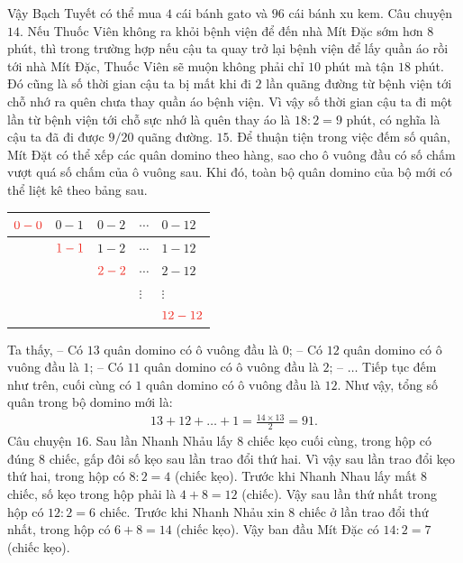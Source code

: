 Vậy Bạch Tuyết có thể mua $4$ cái bánh gato và $96$ cái bánh xu kem.
\vskip 0.1cm
Câu chuyện $14.$
\vskip 0.1cm
Nếu Thuốc Viên không ra khỏi bệnh viện để đến nhà Mít Đặc sớm hơn $8$ phút, thì trong trường hợp nếu cậu ta quay trở lại bệnh viện để lấy quần áo rồi tới nhà Mít Đặc, Thuốc Viên sẽ muộn không phải chỉ $10$ phút mà tận $18$ phút. Đó cũng là số thời gian cậu ta bị mất khi đi $2$ lần quãng đường từ bệnh viện tới chỗ nhớ ra quên chưa thay quần áo bệnh viện. Vì vậy số thời gian cậu ta đi một lần từ bệnh viện tới chỗ sực nhớ là quên thay áo là $18 : 2 = 9$ phút, có nghĩa là cậu ta đã đi được $9/20$ quãng đường.
\vskip 0.1cm
$15.$
Để thuận tiện trong việc đếm số quân, Mít Đặt có thể xếp các quân domino theo hàng, sao cho ô vuông đầu có số chấm vượt quá số chấm của ô vuông sau. Khi đó, toàn bộ quân domino của bộ mới có thể liệt kê theo bảng sau.
\begin{table}[H]
	\centering
	\renewcommand{\arraystretch}{1.3}
	\begin{tabular}{|m{1.5cm}|m{1.5cm}|m{1.5cm}|m{1.5cm}|m{1.5cm}|}
		\hline
		$\color{toanhocdoisong}0-0$ & $0-1$& $0-2$ & $\cdots$ &$0-12$\\
		\hline
		 & $\color{toanhocdoisong}1-1$& $1-2$&$\cdots$& $1-12$\\
		 \hline
		 & & $\color{toanhocdoisong}2-2$&$\cdots$& $2-12$\\
		 \hline
		 & & &$\vdots$& $\vdots$\\
		 \hline
		 & & & & $\color{toanhocdoisong}12-12$\\
		 \hline
	\end{tabular}
\end{table}
Ta thấy,
\vskip 0.1cm
-- Có $13$ quân domino có ô vuông đầu là $0$;
\vskip 0.1cm
-- Có $12$ quân domino có ô vuông đầu là $1$;
\vskip 0.1cm
-- Có $11$ quân domino có ô vuông đầu là $2$;
\vskip 0.1cm
-- $\ldots$
\vskip 0.1cm
Tiếp tục đếm như trên, cuối cùng có $1$ quân domino có ô vuông đầu là $12$.
\vskip 0.1cm
Như vậy, tổng số quân trong bộ domino mới là:
\begin{align*}
	13 + 12 + \ldots + 1 = \frac{14\times13}{2}=91.
\end{align*}
Câu chuyện $16.$
\vskip 0.1cm
Sau lần Nhanh Nhảu lấy $8$ chiếc kẹo cuối cùng, trong hộp có đúng $8$ chiếc, gấp đôi số kẹo sau lần trao đổi thứ hai. Vì vậy sau lần trao đổi kẹo thứ hai, trong hộp có $8:2=4$ (chiếc kẹo). Trước khi Nhanh Nhau lấy mất $8$ chiếc, số kẹo trong hộp phải là $4+8 = 12$ (chiếc). Vậy sau lần
thứ nhất trong hộp có $12:2 = 6$ chiếc. Trước khi Nhanh Nhảu xin $8$ chiếc ở lần trao đổi thứ nhất, trong hộp có $6+8=14$ (chiếc kẹo). Vậy ban đầu Mít Đặc có $14:2=7$ (chiếc kẹo).
